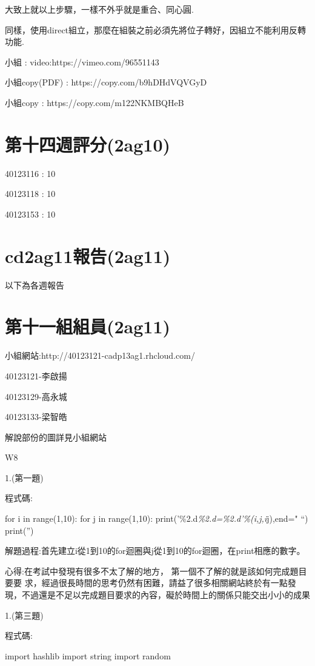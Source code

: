 \documentclass[]{article}
\begin{document}
大致上就以上步驟，一樣不外乎就是重合、同心圓.

同樣，使用direct組立，那麼在組裝之前必須先將位子轉好，因組立不能利用反轉功能.

小組 : video:https://vimeo.com/96551143

小組copy(PDF) : https://copy.com/b9hDHdVQVGyD

小組copy : https://copy.com/m122NKMBQHeB

\section{第十四週評分(2ag10)}\label{ux7b2cux5341ux56dbux9031ux8a55ux52062ag10}

40123116 : 10

40123118 : 10

40123153 : 10

\section{cd2ag11報告(2ag11)}\label{cd2ag11ux5831ux544a2ag11}

以下為各週報告

\section{第十一組組員(2ag11)}\label{ux7b2cux5341ux4e00ux7d44ux7d44ux54e12ag11}

小組網站:http://40123121-cadp13ag1.rhcloud.com/

40123121-李啟揚

40123129-高永城

40123133-梁智皓

解說部份的圖詳見小組網站

W8

1.(第一題)

程式碼:

for i in range(1,10): for j in range(1,10):
print('\%2.d\emph{\%2.d=\%2.d'\%(i,j,i}j),end=" ``) print('')

解題過程:首先建立i從1到10的for迴圈與j從1到10的for迴圈，在print相應的數字。

心得:在考試中發現有很多不太了解的地方，
第一個不了解的就是該如何完成題目要要
求，經過很長時間的思考仍然有困難，請益了很多相關網站終於有一點發現，不過還是不足以完成題目要求的內容，礙於時間上的關係只能交出小小的成果

1.(第三題)

程式碼:

import hashlib import string import random
\end{document}
